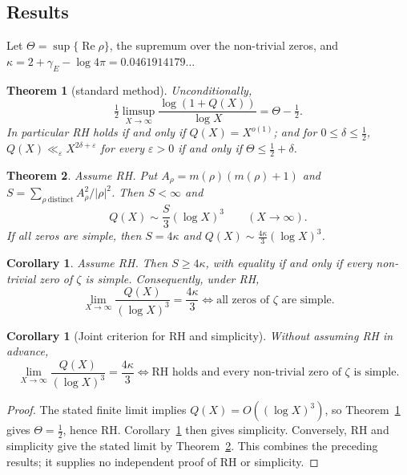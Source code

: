 \documentclass[11pt]{amsart}
\newtheorem{theorem}{Theorem}
\newtheorem{corollary}[lemma]{Corollary}
\theoremstyle{remark}
\theoremstyle{definition}
\newcommand{\gE}{\gamma_E}
\renewcommand{\Re}{\operatorname{Re}}
\begin{document}
\subsection*{Results} Let $\Theta=\sup\{\Re\rho\}$, the supremum over the non-trivial zeros, and $\kappa=2+\gE-\log4\pi=0.0461914179\ldots$

\begin{theorem}[standard method]\label{thm:A}
Unconditionally,
\[
\tfrac12\limsup_{X\to\infty}\frac{\log(1+Q(X))}{\log X}=\Theta-\tfrac12 .
\]
In particular RH holds if and only if $Q(X)=X^{o(1)}$; and for $0\le\delta\le\tfrac12$, $Q(X)\ll_\varepsilon X^{2\delta+\varepsilon}$ for every $\varepsilon>0$ if and only if $\Theta\le\tfrac12+\delta$.
\end{theorem}

\begin{theorem}\label{thm:B}
Assume RH. Put $A_\rho=m(\rho)(m(\rho)+1)$ and $S=\sum_{\rho\ \mathrm{distinct}}A_\rho^2/|\rho|^2$. Then $S<\infty$ and
\[
Q(X)\sim\frac S3(\log X)^3\qquad(X\to\infty).
\]
If all zeros are simple, then $S=4\kappa$ and $Q(X)\sim\frac{4\kappa}{3}(\log X)^3$.
\end{theorem}

\begin{corollary}\label{cor:Bprime}
Assume RH. Then $S\ge4\kappa$, with equality if and only if every non-trivial zero of $\zeta$ is simple. Consequently, under RH,
\[
\lim_{X\to\infty}\frac{Q(X)}{(\log X)^3}=\frac{4\kappa}{3}\iff\text{all zeros of }\zeta\text{ are simple.}
\]
\end{corollary}

\begin{corollary}[Joint criterion for RH and simplicity]\label{cor:joint}
Without assuming RH in advance,
\[
\lim_{X\to\infty}\frac{Q(X)}{(\log X)^3}=\frac{4\kappa}{3}
\iff \text{RH holds and every non-trivial zero of }\zeta\text{ is simple.}
\]
\end{corollary}
\begin{proof}
The stated finite limit implies $Q(X)=O((\log X)^3)$, so Theorem~\ref{thm:A} gives $\Theta=\frac12$, hence RH. Corollary~\ref{cor:Bprime} then gives simplicity. Conversely, RH and simplicity give the stated limit by Theorem~\ref{thm:B}. This combines the preceding results; it supplies no independent proof of RH or simplicity.
\end{proof}
\end{document}
